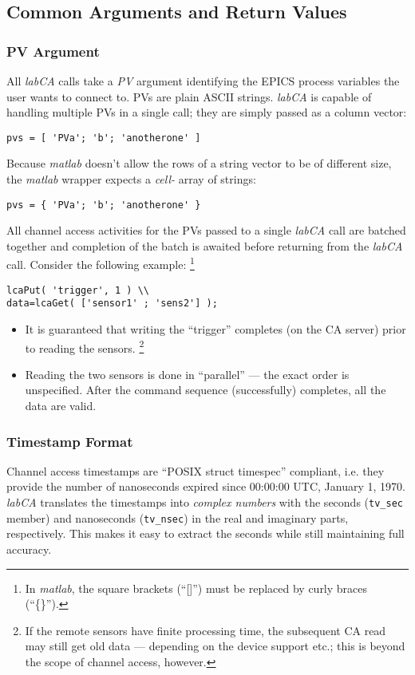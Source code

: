 \documentclass{article}
\newcommand{\sca}{\ita{labCA}}
\newcommand{\matlab}{\ita{matlab}}
\newcommand{\com}[1]{{\tt #1}}
\newcommand{\pbrk}{\pagebreak[3]}
\newcommand{\ita}[1]{\emph{#1}}
\renewcommand{\pbrk}{}
\begin{document}
\pbrk
\subsection{Common Arguments and Return Values}
\subsubsection{PV Argument}
All \sca{} calls take a \ita{PV} argument identifying
the EPICS process variables the user wants to connect to.
PVs are plain ASCII strings. \sca{} is capable of handling
multiple PVs in a single call; they are simply passed as a
column vector:
\begin{verbatim}
pvs = [ 'PVa'; 'b'; 'anotherone' ]
\end{verbatim}
Because \matlab{} doesn't allow the rows of
a string vector to be of different size, the \matlab{}
wrapper expects a \ita{cell-} array of strings:
\begin{verbatim}
pvs = { 'PVa'; 'b'; 'anotherone' }
\end{verbatim}

All channel access activities for the PVs
passed to a single \sca{} call are batched together and
completion of the batch is awaited before returning from
the \sca{} call. Consider the following example:%
\footnote{
In \matlab{}, the square brackets (``[]'') must be replaced
by curly braces (``\{\}'').}
\begin{verbatim}
lcaPut( 'trigger', 1 ) \\
data=lcaGet( ['sensor1' ; 'sens2'] );
\end{verbatim}
\begin{itemize}
%
\item It is guaranteed that writing the ``trigger''
completes (on the CA server) prior to reading the
sensors.%
\footnote{If the remote sensors have finite
processing time, the subsequent CA read may still
get old data --- depending on the device support
etc.; this is beyond the scope of channel access, however.}
%
\item Reading the two sensors is done in ``parallel'' ---
the exact order is unspecified. After the command sequence
(successfully) completes, all the data are valid.
\end{itemize}

\subsubsection{Timestamp Format}
\label{tsformat}
Channel access timestamps are ``POSIX struct timespec''
compliant, i.e. they provide the number of nanoseconds
expired since 00:00:00 UTC, January 1, 1970. \sca{} 
translates the timestamps into \ita{complex numbers}
with the seconds (\com{tv\_sec} member) and nanoseconds
(\com{tv\_nsec}) in the real and imaginary parts, respectively.
This makes it easy to extract the seconds while still maintaining
full accuracy.
\end{document}
